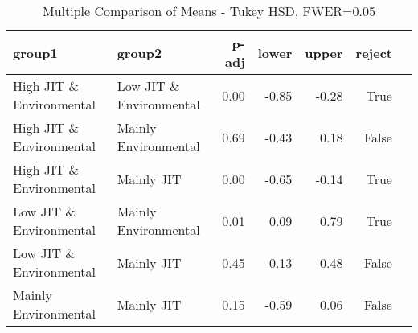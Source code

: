 \begin{table}[htbp]
\centering
\caption{Multiple Comparison of Means - Tukey HSD, FWER=0.05}
\label{tab:your_label}
\begin{tabular}{llrrrrr}
\toprule
group1 & group2 & p-adj & lower & upper & reject \\
\midrule
High JIT \& Environmental & Low JIT \& Environmental & 0.00 & -0.85 & -0.28 & True \\
High JIT \& Environmental & Mainly Environmental & 0.69 & -0.43 & 0.18 & False \\
High JIT \& Environmental & Mainly JIT & 0.00 & -0.65 & -0.14 & True \\
Low JIT \& Environmental & Mainly Environmental & 0.01 & 0.09 & 0.79 & True \\
Low JIT \& Environmental & Mainly JIT & 0.45 & -0.13 & 0.48 & False \\
Mainly Environmental & Mainly JIT & 0.15 & -0.59 & 0.06 & False \\
\bottomrule
\end{tabular}\end{table}